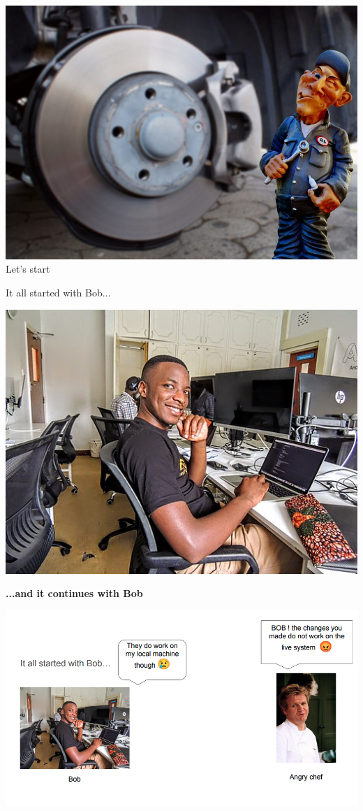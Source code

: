 
\begin{frame}
    \centering\includegraphics[width=.8\textwidth]{./assets/titelbild.jpg}
    \newline
    \huge{Let's start}
\end{frame}


\begin{frame}{It all started with Bob...}
    \begin{center}
        \includegraphics[width=.7\textwidth]{./assets/bob.jpeg}

        \textbf{\Large{...and it continues with Bob}}
    \end{center}
\end{frame}

\begin{frame}
    \begin{center}
        \includegraphics[width=.8\textwidth]{./assets/bob2.png}
    \end{center}
\end{frame}

